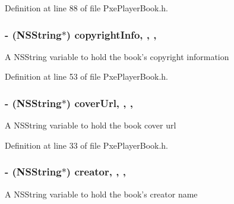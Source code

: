Definition at line 88 of file Pxe\-Player\-Book.\-h.

\hypertarget{interface_pxe_player_book_aca64d2186c8e621147758cdc0f53245b}{
\subsubsection[{copyright\-Info}]{\setlength{\rightskip}{0pt plus 5cm}-\/ (N\-S\-String$\ast$) copyright\-Info\hspace{0.3cm}{\ttfamily [read]}, {\ttfamily [write]}, {\ttfamily [nonatomic]}, {\ttfamily [strong]}}}\label{interface_pxe_player_book_aca64d2186c8e621147758cdc0f53245b}
A N\-S\-String variable to hold the book's copyright information 

Definition at line 53 of file Pxe\-Player\-Book.\-h.

\hypertarget{interface_pxe_player_book_ac76f59149fa39a3e4eb15cfcf289c2dd}{
\subsubsection[{cover\-Url}]{\setlength{\rightskip}{0pt plus 5cm}-\/ (N\-S\-String$\ast$) cover\-Url\hspace{0.3cm}{\ttfamily [read]}, {\ttfamily [write]}, {\ttfamily [nonatomic]}, {\ttfamily [strong]}}}\label{interface_pxe_player_book_ac76f59149fa39a3e4eb15cfcf289c2dd}
A N\-S\-String variable to hold the book cover url 

Definition at line 33 of file Pxe\-Player\-Book.\-h.

\hypertarget{interface_pxe_player_book_ab9a69b163da02700afe3466551e03c8a}{
\subsubsection[{creator}]{\setlength{\rightskip}{0pt plus 5cm}-\/ (N\-S\-String$\ast$) creator\hspace{0.3cm}{\ttfamily [read]}, {\ttfamily [write]}, {\ttfamily [nonatomic]}, {\ttfamily [strong]}}}\label{interface_pxe_player_book_ab9a69b163da02700afe3466551e03c8a}
A N\-S\-String variable to hold the book's creator name 

